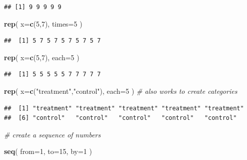 \documentclass[]{book}
\newenvironment{Shaded}{\begin{snugshade}}{\end{snugshade}}
\newcommand{\CommentTok}[1]{\textcolor[rgb]{0.56,0.35,0.01}{\textit{#1}}}
\newcommand{\DataTypeTok}[1]{\textcolor[rgb]{0.13,0.29,0.53}{#1}}
\newcommand{\DecValTok}[1]{\textcolor[rgb]{0.00,0.00,0.81}{#1}}
\newcommand{\KeywordTok}[1]{\textcolor[rgb]{0.13,0.29,0.53}{\textbf{#1}}}
\newcommand{\NormalTok}[1]{#1}
\newcommand{\StringTok}[1]{\textcolor[rgb]{0.31,0.60,0.02}{#1}}
\theoremstyle{definition}
\theoremstyle{definition}
\theoremstyle{definition}
\theoremstyle{remark}
\begin{document}
\begin{verbatim}
## [1] 9 9 9 9 9
\end{verbatim}

\begin{Shaded}
\begin{Highlighting}[]
\KeywordTok{rep}\NormalTok{( }\DataTypeTok{x=}\KeywordTok{c}\NormalTok{(}\DecValTok{5}\NormalTok{,}\DecValTok{7}\NormalTok{), }\DataTypeTok{times=}\DecValTok{5}\NormalTok{ )}
\end{Highlighting}
\end{Shaded}

\begin{verbatim}
##  [1] 5 7 5 7 5 7 5 7 5 7
\end{verbatim}

\begin{Shaded}
\begin{Highlighting}[]
\KeywordTok{rep}\NormalTok{( }\DataTypeTok{x=}\KeywordTok{c}\NormalTok{(}\DecValTok{5}\NormalTok{,}\DecValTok{7}\NormalTok{), }\DataTypeTok{each=}\DecValTok{5}\NormalTok{ )}
\end{Highlighting}
\end{Shaded}

\begin{verbatim}
##  [1] 5 5 5 5 5 7 7 7 7 7
\end{verbatim}

\begin{Shaded}
\begin{Highlighting}[]
\KeywordTok{rep}\NormalTok{( }\DataTypeTok{x=}\KeywordTok{c}\NormalTok{(}\StringTok{"treatment"}\NormalTok{,}\StringTok{"control"}\NormalTok{), }\DataTypeTok{each=}\DecValTok{5}\NormalTok{ )  }\CommentTok{# also works to create categories}
\end{Highlighting}
\end{Shaded}

\begin{verbatim}
##  [1] "treatment" "treatment" "treatment" "treatment" "treatment"
##  [6] "control"   "control"   "control"   "control"   "control"
\end{verbatim}

\begin{Shaded}
\begin{Highlighting}[]
\CommentTok{# create a sequence of numbers}

\KeywordTok{seq}\NormalTok{( }\DataTypeTok{from=}\DecValTok{1}\NormalTok{, }\DataTypeTok{to=}\DecValTok{15}\NormalTok{, }\DataTypeTok{by=}\DecValTok{1}\NormalTok{ )}
\end{Highlighting}
\end{Shaded}
\end{document}
